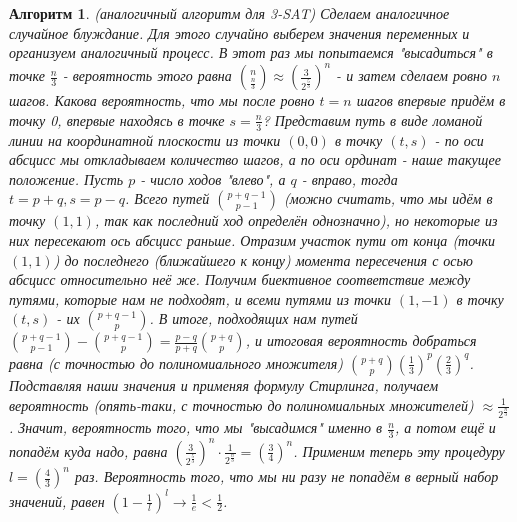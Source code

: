 \documentclass[a4paper]{article}
\theoremstyle{indented}
\newtheorem{alg}{Алгоритм}
\theoremstyle{definition}
\theoremstyle{remark}
\DeclareMathOperator{\ra}{\rightarrow}
\begin{document}
\begin{alg}
(аналогичный алгоритм для 3-SAT) Сделаем аналогичное случайное блуждание. Для этого случайно выберем значения переменных и организуем аналогичный процесс. В этот раз мы попытаемся "высадиться" в точке $\frac{n}{3}$ - вероятность этого равна ${ n \choose \frac{n}{3}} \approx (\frac{3}{2^{\frac{5}{3}}})^n$ - и затем сделаем ровно $n$ шагов. Какова вероятность, что мы после ровно $t=n$ шагов впервые придём в точку 0, впервые находясь в точке $s=\frac{n}{3}$? Представим путь в виде ломаной линии на координатной плоскости из точки $(0, 0)$ в точку $(t, s)$ - по оси абсцисс мы откладываем количество шагов, а по оси ординат - наше такущее положение. Пусть $p$ - число ходов "влево", а $q$ - вправо, тогда $t=p+q, s=p-q$. Всего путей ${p+q-1 \choose p-1}$ (можно считать, что мы идём в точку $(1, 1)$, так как последний ход определён однозначно), но некоторые из них пересекают ось абсцисс раньше. Отразим участок пути от конца (точки $(1, 1)$) до последнего (ближайшего к концу) момента пересечения с осью абсцисс относительно неё же. Получим биективное соответствие между путями, которые нам не подходят, и всеми путями из точки $(1, -1)$ в точку $(t, s)$ - их ${p+q-1 \choose p}$. В итоге, подходящих нам путей ${p+q-1 \choose p-1} - {p+q-1 \choose p}=\frac{p-q}{p+q} {p+q \choose p}$, и итоговая вероятность добраться равна (с точностью до полиномиального множителя) ${p+q \choose p} (\frac{1}{3})^p(\frac{2}{3})^q$. Подставляя наши значения и применяя формулу Стирлинга, получаем вероятность (опять-таки, с точностью до полиномиальных множителей) $\approx \frac{1}{2^{\frac{n}{3}}}$. Значит, вероятность того, что мы "высадимся" именно в $\frac{n}{3}$, а потом ещё и попадём куда надо, равна $(\frac{3}{2^{\frac{5}{3}}})^n \cdot \frac{1}{2^{\frac{n}{3}}} = (\frac{3}{4})^n$. Применим теперь эту процедуру $l=(\frac{4}{3})^n$ раз. Вероятность того, что мы ни разу не попадём в верный набор значений, равен $(1-\frac{1}{l})^l \ra \frac{1}{e} < \frac{1}{2}$.
\end{alg}
\end{document}
